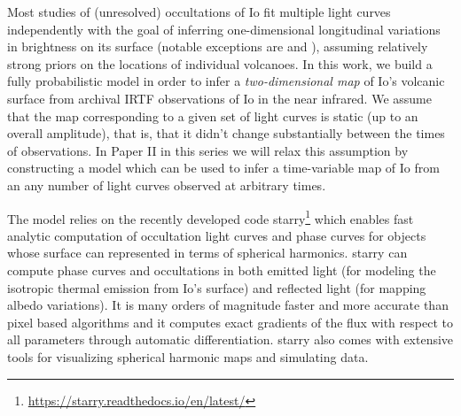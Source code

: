 \documentclass[modern]{aastex62}
\begin{document}
Most studies of (unresolved) occultations of Io fit multiple light curves independently with the goal of inferring one-dimensional longitudinal variations in brightness on its surface (notable exceptions are \cite{spencer1994} and \cite{dekleer2017}), assuming relatively strong priors on the locations of individual volcanoes.
In this work, we build a fully probabilistic model in order to infer a \emph{two-dimensional map} of Io's volcanic surface from archival IRTF observations of Io in the near infrared.
We assume that the map corresponding to a given set of light curves is static (up to an overall amplitude), that is, that it didn't change substantially between the times of observations.
In Paper II in this series we will relax this assumption by constructing a model which can be used to infer a time-variable map of Io from an any number of light curves observed at arbitrary times.

The model relies on the recently developed code \textsf{starry}\footnote{\url{https://starry.readthedocs.io/en/latest/}} \citep[][Luger et al. 2021 in prep]{luger2019a} which enables fast analytic computation of occultation light curves and phase curves for objects whose surface can represented in terms of spherical harmonics.
\textsf{starry} can compute phase curves and occultations in both emitted light (for modeling the isotropic thermal emission from Io's surface) and reflected light (for mapping albedo variations).
It is many orders of magnitude faster and more accurate than pixel based algorithms and it computes exact gradients of the flux with respect to all parameters through automatic differentiation.
\textsf{starry} also comes with extensive tools for visualizing spherical harmonic maps and simulating data.
\end{document}
